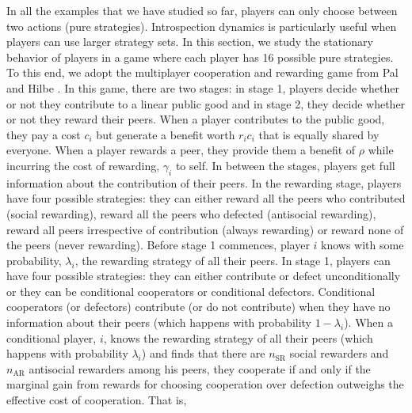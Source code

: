 \documentclass[11pt]{article}
\theoremstyle{plainCl1}
\theoremstyle{plainCl2}
\begin{document}
In all the examples that we have studied so far, players can only choose between two actions (pure strategies). Introspection dynamics is particularly useful when players can use larger strategy sets. In this section, we study the stationary behavior of players in a game where each player has 16 possible pure strategies. To this end, we adopt the multiplayer cooperation and rewarding game from Pal and Hilbe \cite{Pal:NatCom:2022}. In this game, there are two stages: in stage 1, players decide whether or not they contribute to a linear public good and in stage 2, they decide whether or not they reward their peers. When a player contributes to the public good, they pay a cost $c_i$ but generate a benefit worth $r_i c_i$ that is equally shared by everyone. When a player rewards a peer, they provide them a benefit of $\rho$ while incurring the cost of rewarding, $\gamma_i$ to self. In between the stages, players get full information about the contribution of their peers. In the rewarding stage, players have four possible strategies: they can either reward all the peers who contributed (social rewarding), reward all the peers who defected (antisocial rewarding), reward all peers irrespective of contribution (always rewarding) or reward none of the peers (never rewarding). Before stage 1 commences, player $i$ knows with some probability, $\lambda_i$, the rewarding strategy of all their peers. In stage 1, players can have four possible strategies: they can either contribute or defect unconditionally or they can be conditional cooperators or conditional defectors. Conditional cooperators (or defectors) contribute (or do not contribute) when they have no information about their peers (which happens with probability $1 - \lambda_i$). When a conditional player, $i$, knows the rewarding strategy of all their peers (which happens with probability $\lambda_i$) and finds that there are $n_{\mathrm{SR}}$ social rewarders and $n_{\mathrm{AR}}$ antisocial rewarders among his peers, they cooperate if and only if the marginal gain from rewards for choosing cooperation over defection outweighs the effective cost of cooperation. That is, 
\end{document}
